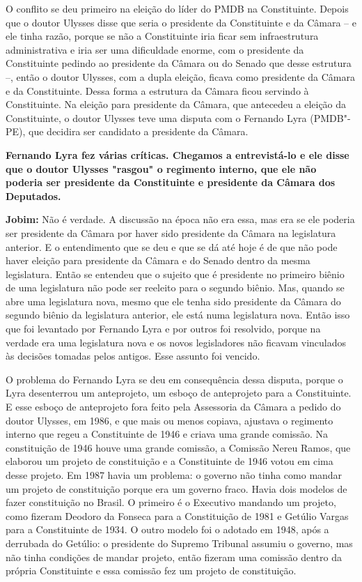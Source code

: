 O conflito se deu primeiro na eleição do líder do PMDB na Constituinte.
Depois que o doutor Ulysses disse que seria o presidente da Constituinte
e da Câmara -- e ele tinha razão, porque se não a Constituinte iria
ficar sem infraestrutura administrativa e iria ser uma dificuldade
enorme, com o presidente da Constituinte pedindo ao presidente da Câmara
ou do Senado que desse estrutura --, então o doutor Ulysses, com a dupla
eleição, ficava como presidente da Câmara e da Constituinte. Dessa forma
a estrutura da Câmara ficou servindo à Constituinte. Na eleição para
presidente da Câmara, que antecedeu a eleição da Constituinte, o doutor
Ulysses teve uma disputa com o Fernando Lyra (PMDB"-PE), que decidira ser
candidato a presidente da Câmara.

\textbf{Fernando Lyra fez várias críticas. Chegamos a entrevistá-lo e
ele disse que o doutor Ulysses "rasgou" o regimento interno, que ele não
poderia ser presidente da Constituinte e presidente da Câmara dos
Deputados.}

\textbf{Jobim:} Não é verdade. A discussão na época não era essa, mas
era se ele poderia ser presidente da Câmara por haver sido presidente da
Câmara na legislatura anterior. E o entendimento que se deu e que se dá
até hoje é de que não pode haver eleição para presidente da Câmara e do
Senado dentro da mesma legislatura. Então se entendeu que o sujeito que
é presidente no primeiro biênio de uma legislatura não pode ser reeleito
para o segundo biênio. Mas, quando se abre uma legislatura nova, mesmo
que ele tenha sido presidente da Câmara do segundo biênio da legislatura
anterior, ele está numa legislatura nova. Então isso que foi levantado
por Fernando Lyra e por outros foi resolvido, porque na verdade era uma
legislatura nova e os novos legisladores não ficavam vinculados às
decisões tomadas pelos antigos. Esse assunto foi vencido.

O problema do Fernando Lyra se deu em consequência dessa disputa, porque
o Lyra desenterrou um anteprojeto, um esboço de anteprojeto para a
Constituinte. E esse esboço de anteprojeto fora feito pela Assessoria da
Câmara a pedido do doutor Ulysses, em 1986, e que mais ou menos copiava,
ajustava o regimento interno que regeu a Constituinte de 1946 e criava
uma grande comissão. Na constituição de 1946 houve uma grande comissão,
a Comissão Nereu Ramos, que elaborou um projeto de constituição e a
Constituinte de 1946 votou em cima desse projeto. Em 1987 havia um
problema: o governo não tinha como mandar um projeto de constituição
porque era um governo fraco. Havia dois modelos de fazer constituição no
Brasil. O primeiro é o Executivo mandando um projeto, como fizeram
Deodoro da Fonseca para a Constituição de 1981 e Getúlio Vargas para a
Constituinte de 1934. O outro modelo foi o adotado em 1948, após a
derrubada do Getúlio: o presidente do Supremo Tribunal assumiu o
governo, mas não tinha condições de mandar projeto, então fizeram uma
comissão dentro da própria Constituinte e essa comissão fez um projeto
de constituição.

